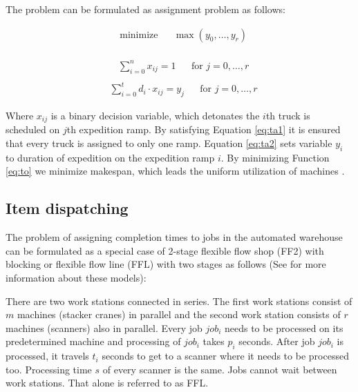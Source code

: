 \documentclass{ctuthesis}
\begin{document}
 
 The problem can be formulated as assignment problem as follows:
 
 \begin{equation}\label{eq:to}
\begin{aligned}
&\text{minimize}
&&\max(y_0, \ldots, y_r)
\end{aligned}
\end{equation}
\\
\begin{equation} \label{eq:ta1}
\begin{aligned}
    & \sum_{i=0}^{n} x_{ij} = 1 && \text{for } j=0, \ldots, r\\
\end{aligned}
\end{equation}
\begin{equation} \label{eq:ta2}
\begin{aligned}
    & \sum_{i=0}^{t} {d_i} \cdot x_{ij} = y_j && \text{for } j=0, \ldots, r
\end{aligned}
\end{equation}
  
Where $x_{ij}$ is a binary decision variable, which detonates the $i$th truck is scheduled on $j$th expedition ramp. By satisfying Equation \ref{eq:ta1} it is ensured that every truck is assigned to only one ramp. Equation \ref{eq:ta2} sets variable $y_i$ to duration of expedition on the expedition ramp $i$. By minimizing Function \ref{eq:to} we minimize makespan, which leads the uniform utilization of machines \cite{pinedo}.

 
\subsection{Item dispatching}
\label{itemdispatching}

The problem of assigning completion times to jobs in the automated warehouse can be formulated as a special case of 2-stage flexible flow shop (FF2) with blocking or flexible flow line (FFL) with two stages as follows (See \cite{pinedo} for more information about these models):

There are two work stations connected in series. The first work stations consist of $m$ machines (stacker cranes) in parallel and the second work station consists of $r$ machines (scanners) also in parallel. Every job $job_i$ needs to be processed on its predetermined machine and processing of $job_i$ takes $p_i$ seconds. After job $job_i$ is processed, it travels $t_i$ seconds to get to a scanner where it needs to be processed too. Processing time $s$ of every scanner is the same. Jobs cannot wait between work stations. That alone is referred to as FFL.
\end{document}
